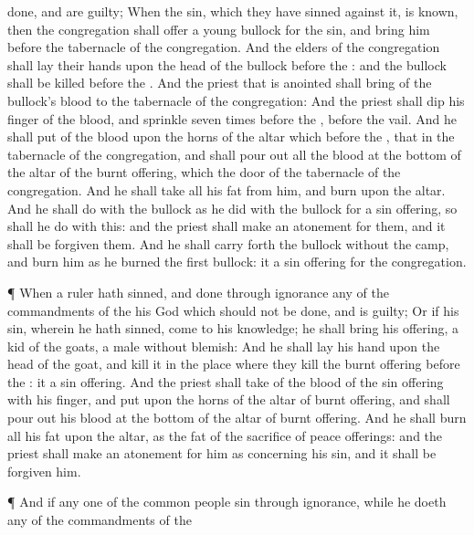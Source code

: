 {done, and are
guilty;
When the
sin, which they have
sinned against it, is
known, then the
congregation shall
offer a
young
bullock for the
sin, and
bring him
before the
tabernacle of the
congregation.
And the
elders of the
congregation shall
lay their
hands upon the
head of the
bullock
before the
{}: and the
bullock shall be
killed
before the
{}.
And the
priest that is
anointed shall
bring of the
bullock’s
blood to the
tabernacle of the
congregation:
And the
priest shall
dip his
finger
{} of the
blood, and
sprinkle
{}
seven
times
before the
{},
{}
before the
vail.
And he shall
put
{} of the
blood upon the
horns of the
altar which
{}
before the
{}, that
{} in the
tabernacle of the
congregation, and shall pour
out all the
blood at the
bottom of the
altar of the burnt
offering, which
{} the
door of the
tabernacle of the
congregation.
And he shall
take all his
fat from him, and
burn
{} upon the
altar.
And he shall
do with the
bullock as he
did with the
bullock for a sin
offering, so shall he
do with this: and the
priest shall make an
atonement for them, and it shall be
forgiven them.
And he shall carry
forth the
bullock
without the
camp, and
burn him as he
burned the
first
bullock: it
{} a sin
offering for the
congregation.
\par }{\PP {}¶ When a
ruler hath
sinned, and
done
{} through
ignorance
{}
any of the
commandments of the
{} his
God
{} which should not be
done, and is
guilty;
Or if his
sin, wherein he hath
sinned, come to his
knowledge; he shall
bring his
offering, a
kid of the
goats, a
male without
blemish:
And he shall
lay his
hand upon the
head of the
goat, and
kill it in the
place where they
kill the burnt
offering
before the
{}: it
{} a sin
offering.
And the
priest shall
take of the
blood of the sin
offering with his
finger, and
put
{} upon the
horns of the
altar of burnt
offering, and shall pour
out his
blood at the
bottom of the
altar of burnt
offering.
And he shall
burn all his
fat upon the
altar, as the
fat of the
sacrifice of peace
offerings: and the
priest shall make an
atonement for him as concerning his
sin, and it shall be
forgiven him.
\par }{\PP {}¶ And if
any
one of the
common
people
sin through
ignorance, while he
doeth
{}
any of the
commandments of the
}
